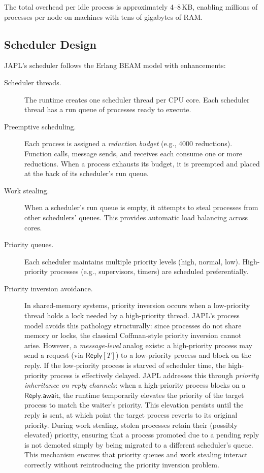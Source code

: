 \documentclass[11pt,a4paper]{article}
\begin{document}
The total overhead per idle process is approximately 4--8\,KB, enabling millions of processes per node on machines with tens of gigabytes of RAM.

\subsection{Scheduler Design}

JAPL's scheduler follows the Erlang BEAM model with enhancements:

\begin{description}
\item[Scheduler threads.] The runtime creates one scheduler thread per CPU core. Each scheduler thread has a run queue of processes ready to execute.

\item[Preemptive scheduling.] Each process is assigned a \emph{reduction budget} (e.g., 4000 reductions). Function calls, message sends, and receives each consume one or more reductions. When a process exhausts its budget, it is preempted and placed at the back of its scheduler's run queue.

\item[Work stealing.] When a scheduler's run queue is empty, it attempts to steal processes from other schedulers' queues. This provides automatic load balancing across cores.

\item[Priority queues.] Each scheduler maintains multiple priority levels (high, normal, low). High-priority processes (e.g., supervisors, timers) are scheduled preferentially.

\item[Priority inversion avoidance.] In shared-memory systems, priority inversion occurs when a low-priority thread holds a lock needed by a high-priority thread. JAPL's process model avoids this pathology structurally: since processes do not share memory or locks, the classical Coffman-style priority inversion cannot arise. However, a \emph{message-level} analog exists: a high-priority process may send a request (via $\mathsf{Reply}[T]$) to a low-priority process and block on the reply. If the low-priority process is starved of scheduler time, the high-priority process is effectively delayed. JAPL addresses this through \emph{priority inheritance on reply channels}: when a high-priority process blocks on a $\mathsf{Reply.await}$, the runtime temporarily elevates the priority of the target process to match the waiter's priority. This elevation persists until the reply is sent, at which point the target process reverts to its original priority. During work stealing, stolen processes retain their (possibly elevated) priority, ensuring that a process promoted due to a pending reply is not demoted simply by being migrated to a different scheduler's queue. This mechanism ensures that priority queues and work stealing interact correctly without reintroducing the priority inversion problem.
\end{description}
\end{document}

